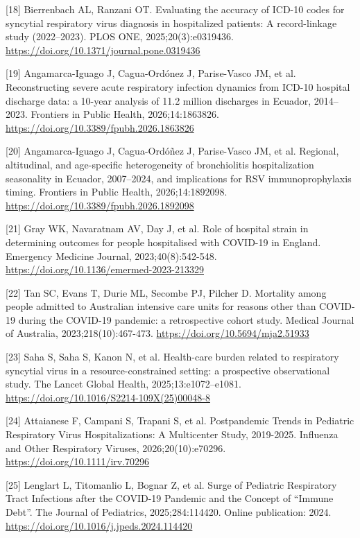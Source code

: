 \documentclass[11pt,a4paper]{article}
\begin{document}
{\small [18] Bierrenbach AL, Ranzani OT. Evaluating the accuracy of ICD-10 codes for syncytial respiratory virus diagnosis in hospitalized patients: A record-linkage study (2022–2023). PLOS ONE, 2025;20(3):e0319436. \url{https://doi.org/10.1371/journal.pone.0319436}\par}
\clearpage
{\small [19] Angamarca-Iguago J, Cagua-Ordónez J, Parise-Vasco JM, et al. Reconstructing severe acute respiratory infection dynamics from ICD-10 hospital discharge data: a 10-year analysis of 11.2 million discharges in Ecuador, 2014–2023. Frontiers in Public Health, 2026;14:1863826. \url{https://doi.org/10.3389/fpubh.2026.1863826}\par}
{\small [20] Angamarca-Iguago J, Cagua-Ordóñez J, Parise-Vasco JM, et al. Regional, altitudinal, and age-specific heterogeneity of bronchiolitis hospitalization seasonality in Ecuador, 2007–2024, and implications for RSV immunoprophylaxis timing. Frontiers in Public Health, 2026;14:1892098. \url{https://doi.org/10.3389/fpubh.2026.1892098}\par}
{\small [21] Gray WK, Navaratnam AV, Day J, et al. Role of hospital strain in determining outcomes for people hospitalised with COVID-19 in England. Emergency Medicine Journal, 2023;40(8):542-548. \url{https://doi.org/10.1136/emermed-2023-213329}\par}
{\small [22] Tan SC, Evans T, Durie ML, Secombe PJ, Pilcher D. Mortality among people admitted to Australian intensive care units for reasons other than COVID-19 during the COVID-19 pandemic: a retrospective cohort study. Medical Journal of Australia, 2023;218(10):467-473. \url{https://doi.org/10.5694/mja2.51933}\par}
{\small [23] Saha S, Saha S, Kanon N, et al. Health-care burden related to respiratory syncytial virus in a resource-constrained setting: a prospective observational study. The Lancet Global Health, 2025;13:e1072–e1081. \url{https://doi.org/10.1016/S2214-109X(25)00048-8}\par}
{\small [24] Attaianese F, Campani S, Trapani S, et al. Postpandemic Trends in Pediatric Respiratory Virus Hospitalizations: A Multicenter Study, 2019-2025. Influenza and Other Respiratory Viruses, 2026;20(10):e70296. \url{https://doi.org/10.1111/irv.70296}\par}
{\small [25] Lenglart L, Titomanlio L, Bognar Z, et al. Surge of Pediatric Respiratory Tract Infections after the COVID-19 Pandemic and the Concept of “Immune Debt”. The Journal of Pediatrics, 2025;284:114420. Online publication: 2024. \url{https://doi.org/10.1016/j.jpeds.2024.114420}\par}
\end{document}
